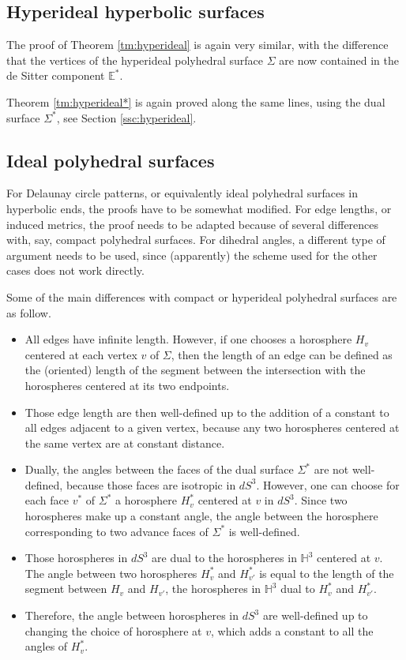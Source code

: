 \documentclass[notitlepage,twoside,a4paper]{amsart}
\theoremstyle{named}
\newcommand{\HH}{{\mathbb H}}
\newcommand{\bE}{{\mathbb E}}
\begin{document}
\subsection{Hyperideal hyperbolic surfaces}

The proof of Theorem \ref{tm:hyperideal} is again very similar, with the difference that the vertices of the hyperideal polyhedral surface $\Sigma$ are now contained in the de Sitter component $\bE^*$.

Theorem \ref{tm:hyperideal*} is again proved along the same lines, using the dual surface $\Sigma^*$, see Section \ref{ssc:hyperideal}.

\subsection{Ideal polyhedral surfaces}
\label{ssc:ideal-dual}

For Delaunay circle patterns, or equivalently ideal polyhedral surfaces in hyperbolic ends, the proofs have to be somewhat modified. For edge lengths, or induced metrics, the proof needs to be adapted because of several differences with, say, compact polyhedral surfaces. For dihedral angles, a different type of argument needs to be used, since (apparently) the scheme used for the other cases does not work directly.

Some of the main differences with compact or hyperideal polyhedral surfaces are as follow. 

\begin{itemize}
\item All edges have infinite length. However, if one chooses a horosphere $H_v$ centered at each vertex $v$ of $\Sigma$, then the length of an edge can be defined as the (oriented) length of the segment between the intersection with the horospheres centered at its two endpoints.
\item Those edge length are then well-defined up to the addition of a constant to all edges adjacent to a given vertex, because any two horospheres centered at the same vertex are at constant distance.
\item Dually, the angles between the faces of the dual surface $\Sigma^*$ are not well-defined, because those faces are isotropic in $dS^3$. However, one can choose for each face $v^*$ of $\Sigma^*$ a horosphere $H^*_v$ centered at $v$ in $dS^3$. Since two horospheres make up a constant angle, the angle between the horosphere corresponding to two advance faces of $\Sigma^*$ is well-defined.
\item Those horospheres in $dS^3$ are dual to the horospheres in $\HH^3$ centered at $v$. The angle between two horospheres $H^*_v$ and $H^*_{v'}$ is equal to the length of the segment between $H_v$ and $H_{v'}$, the horospheres in $\HH^3$ dual to  $H^*_v$ and $H^*_{v'}$.
\item Therefore, the angle between horospheres in $dS^3$ are well-defined up to changing the choice of horosphere at $v$, which adds a constant to all the angles of $H^*_v$.
\end{itemize}
\end{document}
